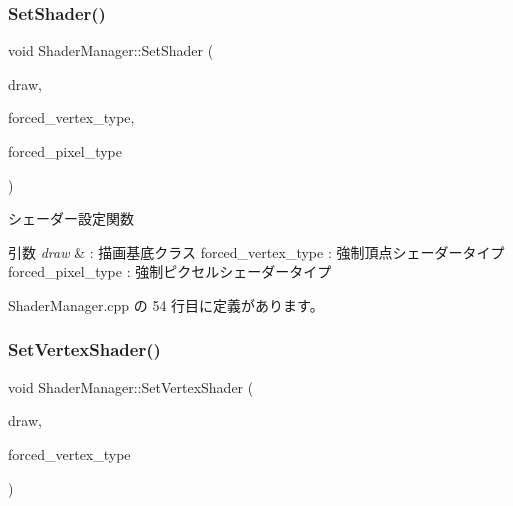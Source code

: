 \subsubsection{\texorpdfstring{Set\+Shader()}{SetShader()}}
{\footnotesize\ttfamily void Shader\+Manager\+::\+Set\+Shader (\begin{DoxyParamCaption}\item[{\mbox{\hyperlink{class_draw_base}{Draw\+Base}} $\ast$}]{draw,  }\item[{\mbox{\hyperlink{class_shader_manager_a9b51e49d70eb3cc58f6d1f3994e8cfbd}{Vertex\+Shader\+Type}}}]{forced\+\_\+vertex\+\_\+type,  }\item[{\mbox{\hyperlink{class_shader_manager_a7d15d773b3c6a99dd7086c45c8b0be5f}{Pixel\+Shader\+Type}}}]{forced\+\_\+pixel\+\_\+type }\end{DoxyParamCaption})}



シェーダー設定関数 


\begin{DoxyParams}{引数}
{\em draw} & \+: 描画基底クラス forced\+\_\+vertex\+\_\+type \+: 強制頂点シェーダータイプ forced\+\_\+pixel\+\_\+type \+: 強制ピクセルシェーダータイプ \\
\hline
\end{DoxyParams}


 Shader\+Manager.\+cpp の 54 行目に定義があります。

\mbox{\label{class_shader_manager_a3661a079ae4e9e7e4d5da35f2171b41e}} 
\subsubsection{\texorpdfstring{Set\+Vertex\+Shader()}{SetVertexShader()}}
{\footnotesize\ttfamily void Shader\+Manager\+::\+Set\+Vertex\+Shader (\begin{DoxyParamCaption}\item[{\mbox{\hyperlink{class_draw_base}{Draw\+Base}} $\ast$}]{draw,  }\item[{\mbox{\hyperlink{class_shader_manager_a9b51e49d70eb3cc58f6d1f3994e8cfbd}{Vertex\+Shader\+Type}}}]{forced\+\_\+vertex\+\_\+type }\end{DoxyParamCaption})\hspace{0.3cm}{\ttfamily [private]}}



